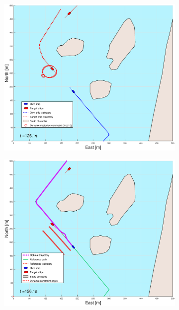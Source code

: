 \begin{figure}[ht]
\begin{subfigure}[b]{0.499\textwidth}
    \end{subfigure}
    \hfill
    \\
    \begin{subfigure}[b]{0.49\textwidth}
        \centering
        \includegraphics[width=\textwidth]{Images/Figures/Helloya/_Simple_0fig1_time=126}
    \end{subfigure}
    \hfill
    \begin{subfigure}[b]{0.499\textwidth}
        \centering
        \includegraphics[width=\textwidth]{Images/Figures/Helloya/_Simple_0fig999_time=126}

\end{subfigure}
\end{figure}
